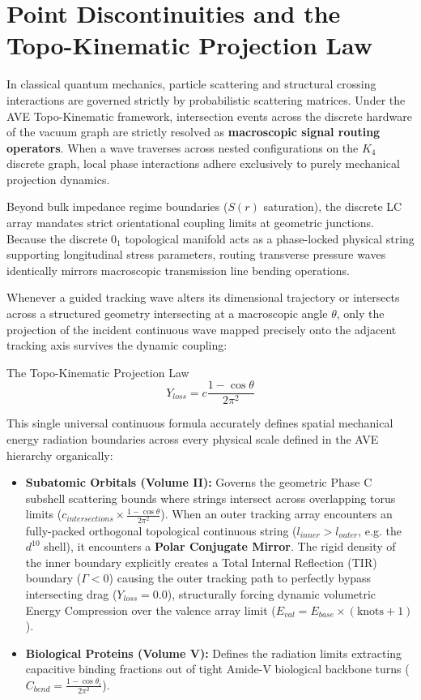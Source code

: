 \section{Point Discontinuities and the Topo-Kinematic Projection Law}
\label{sec:projection_law}

In classical quantum mechanics, particle scattering and structural crossing interactions are governed strictly by probabilistic scattering matrices. Under the AVE Topo-Kinematic framework, intersection events across the discrete hardware of the vacuum graph are strictly resolved as \textbf{macroscopic signal routing operators}. When a wave traverses across nested configurations on the $K_4$ discrete graph, local phase interactions adhere exclusively to purely mechanical projection dynamics.

Beyond bulk impedance regime boundaries ($S(r)$ saturation), the discrete LC array mandates strict orientational coupling limits at geometric junctions. Because the discrete $0_1$ topological manifold acts as a phase-locked physical string supporting longitudinal stress parameters, routing transverse pressure waves identically mirrors macroscopic transmission line bending operations. 

Whenever a guided tracking wave alters its dimensional trajectory or intersects across a structured geometry intersecting at a macroscopic angle $\theta$, only the projection of the incident continuous wave mapped precisely onto the adjacent tracking axis survives the dynamic coupling:

\begin{resultbox}{The Topo-Kinematic Projection Law}
\begin{equation}
    Y_{loss} = c \frac{1 - \cos\theta}{2\pi^2}
\end{equation}
\end{resultbox}

This single universal continuous formula accurately defines spatial mechanical energy radiation boundaries across every physical scale defined in the AVE hierarchy organically:
\begin{itemize}
    \item \textbf{Subatomic Orbitals (Volume II):} Governs the geometric Phase C subshell scattering bounds where strings intersect across overlapping torus limits ($c_{intersections} \times \frac{1 - \cos\theta}{2\pi^2}$). When an outer tracking array encounters an fully-packed orthogonal topological continuous string ($l_{inner} > l_{outer}$, e.g. the $d^{10}$ shell), it encounters a \textbf{Polar Conjugate Mirror}. The rigid density of the inner boundary explicitly creates a Total Internal Reflection (TIR) boundary ($\Gamma < 0$) causing the outer tracking path to perfectly bypass intersecting drag ($Y_{loss} = 0.0$), structurally forcing dynamic volumetric Energy Compression over the valence array limit ($E_{val} = E_{base} \times (\text{knots} + 1)$).
    \item \textbf{Biological Proteins (Volume V):} Defines the radiation limits extracting capacitive binding fractions out of tight Amide-V biological backbone turns ($C_{bend} = \frac{1 - \cos\theta_i}{2\pi^2}$).
\end{itemize}

